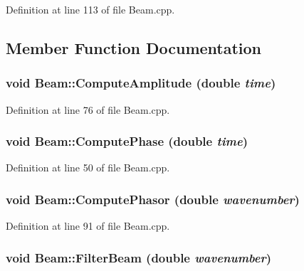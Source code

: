 Definition at line 113 of file Beam.cpp.



\subsection{Member Function Documentation}
\hypertarget{classBeam_ada1230316b0e535d81383a9bb65bf538}{
\subsubsection[{ComputeAmplitude}]{\setlength{\rightskip}{0pt plus 5cm}void Beam::ComputeAmplitude (double {\em time})}}
\label{classBeam_ada1230316b0e535d81383a9bb65bf538}


Definition at line 76 of file Beam.cpp.

\hypertarget{classBeam_aeaad2ad917df4957a3da23267e0753a7}{
\subsubsection[{ComputePhase}]{\setlength{\rightskip}{0pt plus 5cm}void Beam::ComputePhase (double {\em time})}}
\label{classBeam_aeaad2ad917df4957a3da23267e0753a7}


Definition at line 50 of file Beam.cpp.

\hypertarget{classBeam_a466fbf1bc5b110e62b40a7729be3a87e}{
\subsubsection[{ComputePhasor}]{\setlength{\rightskip}{0pt plus 5cm}void Beam::ComputePhasor (double {\em wavenumber})}}
\label{classBeam_a466fbf1bc5b110e62b40a7729be3a87e}


Definition at line 91 of file Beam.cpp.

\hypertarget{classBeam_a8d515929f16780a73c997f659d4c1c97}{
\subsubsection[{FilterBeam}]{\setlength{\rightskip}{0pt plus 5cm}void Beam::FilterBeam (double {\em wavenumber})}}
\label{classBeam_a8d515929f16780a73c997f659d4c1c97}


